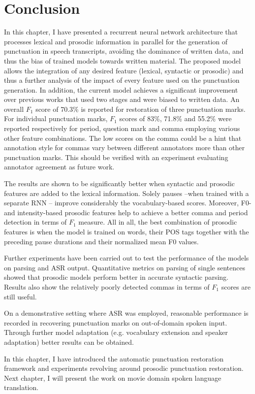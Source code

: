 \section{Conclusion}
\label{punkProse:discussion}
In this chapter, I have presented a recurrent neural network architecture that processes lexical and prosodic information in parallel for the generation of punctuation in speech transcripts, avoiding the dominance of written data, and thus the bias of trained models towards written material. The proposed model allows the integration of any desired feature (lexical, syntactic or prosodic) and thus a further analysis of the impact of every feature used on the punctuation generation. In addition, the current model achieves a significant improvement over previous works that used two stages and were biased to written data. An overall $F_1$ score of 70.3\% is reported for restoration of three punctuation marks. For individual punctuation marks, $F_1$ scores of 83\%, 71.8\% and 55.2\% were reported respectively for period, question mark and comma employing various other feature combinations. The low scores on the comma could be a hint that annotation style for commas vary between different annotators more than other punctuation marks. This should be verified with an experiment evaluating annotator agreement as future work.  


The results are shown to be significantly better when syntactic and prosodic features are added to the lexical information. Solely pauses --when trained with a separate RNN -- improve considerably the vocabulary-based scores. Moreover, F0- and intensity-based prosodic features help to achieve a better comma and period detection in terms of $F_1$ measure. All in all, the best combination of prosodic features is when the model is trained on words, their POS tags together with the preceding pause durations and their normalized mean F0 values. 

Further experiments have been carried out to test the performance of the models on parsing and ASR output. Quantitative metrics on parsing of single sentences showed that prosodic models perform better in accurate syntactic parsing. Results also show the relatively poorly detected commas in terms of $F_1$ scores are still useful. 

On a demonstrative setting where ASR was employed, reasonable performance is recorded in recovering punctuation marks on out-of-domain spoken input. Through further model adaptation (e.g. vocabulary extension and speaker adaptation) better results can be obtained.


In this chapter, I have introduced the automatic punctuation restoration framework and experiments revolving around prosodic punctuation restoration. Next chapter, I will present the work on movie domain spoken language translation. 

